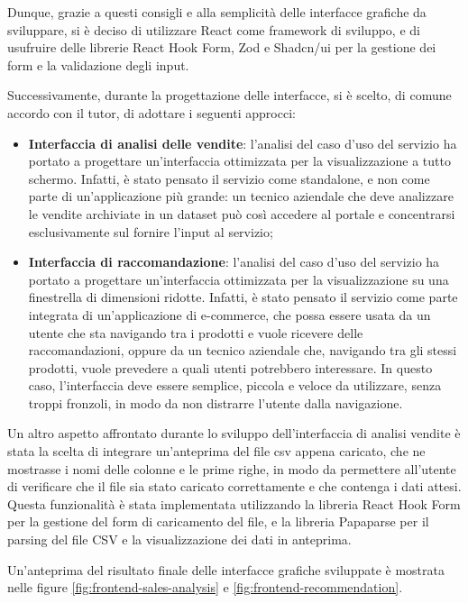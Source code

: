 Dunque, grazie a questi consigli e alla semplicità delle interfacce grafiche da sviluppare, si è deciso di utilizzare React come framework di sviluppo, e di usufruire delle librerie React Hook Form, Zod e Shadcn/ui per la gestione dei form e la validazione degli input.

Successivamente, durante la progettazione delle interfacce, si è scelto, di comune accordo con il tutor, di adottare i seguenti approcci:
\begin{itemize}
    \item \textbf{Interfaccia di analisi delle vendite}: l'analisi del caso d'uso del servizio ha portato a progettare un'interfaccia ottimizzata per la visualizzazione a tutto schermo. Infatti, è stato pensato il servizio come standalone, e non come parte di un'applicazione più grande: un tecnico aziendale che deve analizzare le vendite archiviate in un dataset può così accedere al portale e concentrarsi esclusivamente sul fornire l'input al servizio;
    \item \textbf{Interfaccia di raccomandazione}: l'analisi del caso d'uso del servizio ha portato a progettare un'interfaccia ottimizzata per la visualizzazione su una finestrella di dimensioni ridotte. Infatti, è stato pensato il servizio come parte integrata di un'applicazione di e-commerce, che possa essere usata da un utente che sta navigando tra i prodotti e vuole ricevere delle raccomandazioni, oppure da un tecnico aziendale che, navigando tra gli stessi prodotti, vuole prevedere a quali utenti potrebbero interessare. In questo caso, l'interfaccia deve essere semplice, piccola e veloce da utilizzare, senza troppi fronzoli, in modo da non distrarre l'utente dalla navigazione.
\end{itemize}

Un altro aspetto affrontato durante lo sviluppo dell'interfaccia di analisi vendite è stata la scelta di integrare un'anteprima del file csv appena caricato, che ne mostrasse i nomi delle colonne e le prime righe, in modo da permettere all'utente di verificare che il file sia stato caricato correttamente e che contenga i dati attesi. Questa funzionalità è stata implementata utilizzando la libreria React Hook Form per la gestione del form di caricamento del file, e la libreria Papaparse per il parsing del file CSV e la visualizzazione dei dati in anteprima.

Un'anteprima del risultato finale delle interfacce grafiche sviluppate è mostrata nelle figure \ref{fig:frontend-sales-analysis} e \ref{fig:frontend-recommendation}.

